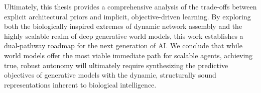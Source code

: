 Ultimately, this thesis provides a comprehensive analysis of the trade-offs between explicit architectural priors and implicit, objective-driven learning. By exploring both the biologically inspired extremes of dynamic network assembly and the highly scalable realm of deep generative world models, this work establishes a dual-pathway roadmap for the next generation of AI. We conclude that while world models offer the most viable immediate path for scalable agents, achieving true, robust autonomy will ultimately require synthesizing the predictive objectives of generative models with the dynamic, structurally sound representations inherent to biological intelligence.